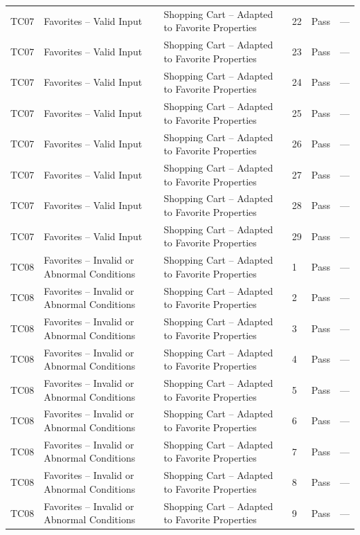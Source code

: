 {\begin{longtable}{@{}p{1.2cm} p{4.2cm} p{4.4cm} p{0.8cm} p{0.9cm} p{1.6cm}@{}}
  TC07 & Favorites -- Valid Input & Shopping Cart -- Adapted to Favorite Properties & 22 & Pass & --- \\
  TC07 & Favorites -- Valid Input & Shopping Cart -- Adapted to Favorite Properties & 23 & Pass & --- \\
  TC07 & Favorites -- Valid Input & Shopping Cart -- Adapted to Favorite Properties & 24 & Pass & --- \\
  TC07 & Favorites -- Valid Input & Shopping Cart -- Adapted to Favorite Properties & 25 & Pass & --- \\
  TC07 & Favorites -- Valid Input & Shopping Cart -- Adapted to Favorite Properties & 26 & Pass & --- \\
  TC07 & Favorites -- Valid Input & Shopping Cart -- Adapted to Favorite Properties & 27 & Pass & --- \\
  TC07 & Favorites -- Valid Input & Shopping Cart -- Adapted to Favorite Properties & 28 & Pass & --- \\
  TC07 & Favorites -- Valid Input & Shopping Cart -- Adapted to Favorite Properties & 29 & Pass & --- \\
  \midrule
  TC08 & Favorites -- Invalid or Abnormal Conditions & Shopping Cart -- Adapted to Favorite Properties & 1 & Pass & --- \\
  TC08 & Favorites -- Invalid or Abnormal Conditions & Shopping Cart -- Adapted to Favorite Properties & 2 & Pass & --- \\
  TC08 & Favorites -- Invalid or Abnormal Conditions & Shopping Cart -- Adapted to Favorite Properties & 3 & Pass & --- \\
  TC08 & Favorites -- Invalid or Abnormal Conditions & Shopping Cart -- Adapted to Favorite Properties & 4 & Pass & --- \\
  TC08 & Favorites -- Invalid or Abnormal Conditions & Shopping Cart -- Adapted to Favorite Properties & 5 & Pass & --- \\
  TC08 & Favorites -- Invalid or Abnormal Conditions & Shopping Cart -- Adapted to Favorite Properties & 6 & Pass & --- \\
  TC08 & Favorites -- Invalid or Abnormal Conditions & Shopping Cart -- Adapted to Favorite Properties & 7 & Pass & --- \\
  TC08 & Favorites -- Invalid or Abnormal Conditions & Shopping Cart -- Adapted to Favorite Properties & 8 & Pass & --- \\
  TC08 & Favorites -- Invalid or Abnormal Conditions & Shopping Cart -- Adapted to Favorite Properties & 9 & Pass & --- \\

\end{longtable}}
